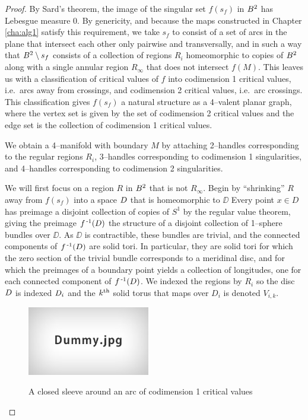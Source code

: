 \begin{proof}%
	By Sard's theorem, the image of the singular set $f(s_f)$ in $B^2$ has Lebesgue measure 0.
	By genericity, and because the maps constructed in Chapter \ref{cha:alg1} satisfy this requirement, we take $s_f$ to consist of a set of arcs in the plane that intersect each other only pairwise and transversally, and in such a way that $B^2\setminus s_f$ consists of a collection of regions $R_i$ homeomorphic to copies of $B^2$ along with a single annular region $R_\infty$ that does not intersect $f(M)$.
	This leaves us with a classification of critical values of $f$ into codimension 1 critical values, i.e.\ arcs away from crossings, and codimension 2 critical values, i.e.\ arc crossings.
	This classification gives $f(s_f)$ a natural structure as a 4--valent planar graph, where the vertex set is given by the set of codimension 2 critical values and the edge set is the collection of codimension 1 critical values.
	
	We obtain a 4--manifold with boundary $M$ by attaching 2--handles corresponding to the regular regions $R_i$, 3--handles corresponding to codimension 1 singularities, and 4--handles corresponding to codimension 2 singularities.
	
	We will first focus on a region $R$ in $B^2$ that is not $R_\infty$.
	Begin by ``shrinking'' $R$ away from $f(s_f)$ into a space $D$ that is homeomorphic to $\DD$
	Every point $x\in D$ has preimage a disjoint collection of copies of $S^1$ by the regular value theorem, giving the preimage $f^{\,\text{-}1}(D)$ the structure of a disjoint collection of 1--sphere bundles over $\DD$.
	As $\DD$ is contractible, these bundles are trivial, and the connected components of $f^{\,\text{-}1}(D)$ are solid tori.
	In particular, they are solid tori for which the zero section of the trivial bundle corresponds to a meridinal disc, and for which the preimages of a boundary point yields a collection of longitudes, one for each connected component of $f^{\,\text{-}1}(D)$.
	We indexed the regions by $R_i$ so the disc $D$ is indexed $D_i$ and the $k^{\text{th}}$ solid torus that maps over $D_i$ is denoted $V_{i,k}$.
	
	\begin{figure}
		\centering
		\caption{A closed sleeve around an arc of codimension 1 critical values}
		\includegraphics[height=3cm]{figures/dummy.jpg}
		\label{fig:arcsleeve}
	\end{figure}
	

\end{proof}
